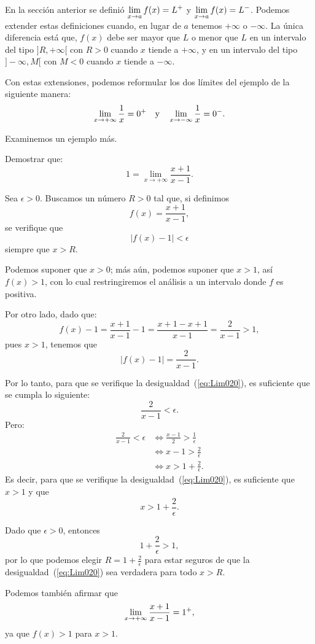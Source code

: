 En la sección anterior se definió $\displaystyle\limjc{f(x)}{x}{a} = L^+$ y
$\displaystyle\limjc{f(x)}{x}{a} = L^-$. Podemos extender estas definiciones cuando, en lugar de
$a$ tenemos $+\infty$ o $-\infty$. La única diferencia está que, $f(x)$ debe ser mayor que $L$ o
menor que $L$ en un intervalo del tipo $]R,+\infty[$ con $R > 0$ cuando $x$ tiende a $+\infty$, y
en un intervalo del tipo $]-\infty,M[$ con $M < 0$ cuando $x$ tiende a $-\infty$.

Con estas extensiones, podemos reformular los dos límites del ejemplo de la siguiente manera:
\[
\limjc{\frac{1}{x}}{x}{+\infty} = 0^+ \yjc \limjc{\frac{1}{x}}{x}{-\infty} = 0^-.
\]

Examinemos un ejemplo más.

\begin{exemplo}[Solución]{%
Demostrar que:
\[
1 = \lim_{x \to +\infty}\frac{x+1}{x-1}.
\]
}%

Sea $\epsilon > 0$. Buscamos un número $R > 0$ tal que, si definimos
\[
f(x) = \frac{x+1}{x-1},
\]
se verifique que
\begin{equation}
\label{eq:Lim020}
\left|f(x)-1\right| < \epsilon
\end{equation}
siempre que $x > R$.

Podemos suponer que $x > 0$; más aún, podemos suponer que $x > 1$, así $f(x) > 1$, con lo cual
restringiremos el análisis a un intervalo donde $f$ es positiva.

Por otro lado, dado que:
\begin{equation*}
	f(x) - 1 = \frac{x+1}{x-1}-1 = \frac{x+1-x+1}{x-1} = \frac{2}{x - 1} > 1,
\end{equation*}
pues $x > 1$, tenemos que
\[
|f(x) - 1| = \frac{2}{x - 1}.
\]

Por lo tanto, para que se verifique la desigualdad~(\ref{eq:Lim020}), es suficiente que se cumpla
lo siguiente:
\[
\frac{2}{x - 1} < \epsilon.
\]
Pero:
\begin{align*}
\frac{2}{x - 1} < \epsilon &\Longleftrightarrow \frac{x - 1}{2} > \frac{1}{\epsilon} \\
&\Longleftrightarrow x - 1 > \frac{2}{\epsilon} \\
&\Longleftrightarrow x > 1 + \frac{2}{\epsilon}.
\end{align*}
Es decir, para que se verifique la desigualdad~(\ref{eq:Lim020}), es suficiente que $x > 1$ y que
\[
x > 1 + \frac{2}{\epsilon}.
\]

Dado que $\epsilon > 0$, entonces
\[
1 + \frac{2}{\epsilon} > 1,
\]
por lo que podemos elegir $R = 1 + \frac{2}{\epsilon}$ para estar seguros de que la
desigualdad~(\ref{eq:Lim020}) sea verdadera para todo $x > R$.

Podemos también afirmar que
\[
\limjc{\frac{x + 1}{x - 1}}{x}{+\infty} = 1^+,
\]
ya que $f(x) > 1$ para $x > 1$.
\end{exemplo}

